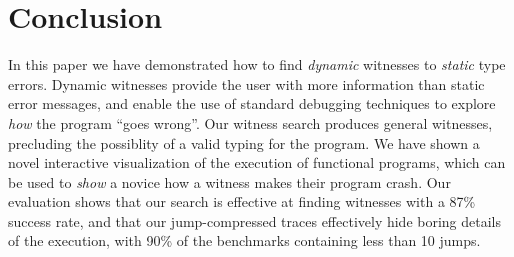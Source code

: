 \section{Conclusion}
\label{sec:nanomaly:conclusion}
In this paper we have demonstrated how to find \emph{dynamic} witnesses
to \emph{static} type errors.
%
Dynamic witnesses provide the user with more information than static
error messages, and enable the use of standard debugging techniques
to explore \emph{how} the program ``goes wrong''.
%
Our witness search produces general witnesses, precluding the
possiblity of a valid typing for the program.
%
We have shown a novel interactive visualization of the execution of
functional programs, which can be used to \emph{show} a novice how a
witness makes their program crash.
%
Our evaluation shows that our search is effective at finding witnesses
with a 87\% success rate, and that our jump-compressed traces
effectively hide boring details of the execution, with 90\% of the
benchmarks containing less than 10 jumps.

